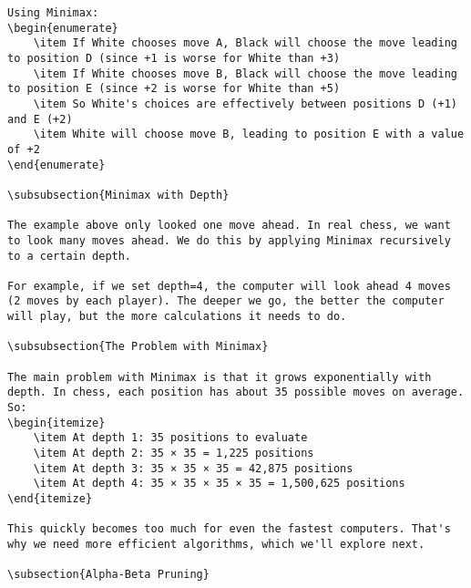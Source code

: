 \documentclass[11pt]{article}
\begin{document}
\begin{lstlisting}[style=Python]
Using Minimax:
\begin{enumerate}
    \item If White chooses move A, Black will choose the move leading to position D (since +1 is worse for White than +3)
    \item If White chooses move B, Black will choose the move leading to position E (since +2 is worse for White than +5)
    \item So White's choices are effectively between positions D (+1) and E (+2)
    \item White will choose move B, leading to position E with a value of +2
\end{enumerate}

\subsubsection{Minimax with Depth}

The example above only looked one move ahead. In real chess, we want to look many moves ahead. We do this by applying Minimax recursively to a certain depth.

For example, if we set depth=4, the computer will look ahead 4 moves (2 moves by each player). The deeper we go, the better the computer will play, but the more calculations it needs to do.

\subsubsection{The Problem with Minimax}

The main problem with Minimax is that it grows exponentially with depth. In chess, each position has about 35 possible moves on average. So:
\begin{itemize}
    \item At depth 1: 35 positions to evaluate
    \item At depth 2: 35 × 35 = 1,225 positions
    \item At depth 3: 35 × 35 × 35 = 42,875 positions
    \item At depth 4: 35 × 35 × 35 × 35 = 1,500,625 positions
\end{itemize}

This quickly becomes too much for even the fastest computers. That's why we need more efficient algorithms, which we'll explore next.

\subsection{Alpha-Beta Pruning}


\end{lstlisting}
\end{document}
